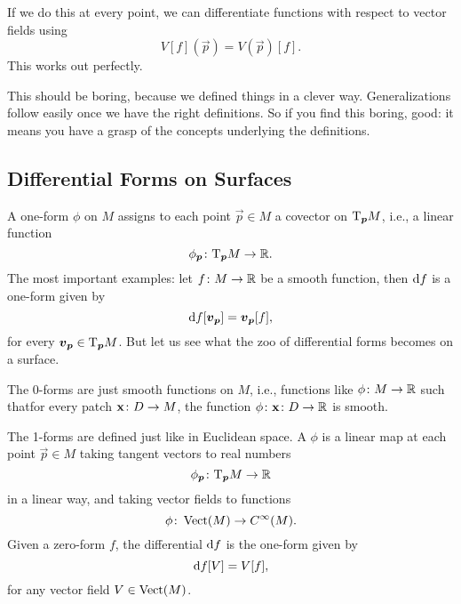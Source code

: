 If we do this at every point, we can differentiate functions with
respect to vector fields using
\begin{equation}
V[f](\vec{p}) = V(\vec{p})[f].
\end{equation}
This works out perfectly.

\begin{remark}[Boring]
This should be boring, because we defined things in a clever way.
Generalizations follow easily once we have the right definitions.
So if you find this boring, good: it means you have a grasp of the
concepts underlying the definitions.
\end{remark}

\subsection{Differential Forms on Surfaces}

\M A one-form $\phi$ on $M$ assigns to each point $\vec{p}\in M$ a
covector on $\mathrm{T}_{\boldsymbol{p}}M$, i.e., a linear function
\begin{equation}
\phi_{\boldsymbol{p}}\colon \mathrm{T}_{\boldsymbol{p}}M\to\mathbb{R}.
\end{equation}
The most important examples: let $f\colon M\to\mathbb{R}$ be a smooth function,
then $\mathrm{d} f$ is a one-form given by
\begin{equation}
\mathrm{d} f[\boldsymbol{v}_{\boldsymbol{p}}] = \boldsymbol{v}_{\boldsymbol{p}}[f],
\end{equation}
for every $\boldsymbol{v}_{\boldsymbol{p}}\in\mathrm{T}_{\boldsymbol{p}}M$.
But let us see what the zoo of differential forms becomes on a surface.

The 0-forms are just smooth functions on $M$, i.e.,
functions like $\phi\colon M\to\mathbb{R}$ such thatfor every patch
$\mathbf{x}\colon D\to M$, the function $\phi\colon\mathbf{x}\colon D\to\mathbb{R}$
is smooth.

The 1-forms are defined just like in Euclidean space. A
 $\phi$ is a linear map at each point $\vec{p}\in M$
taking tangent vectors to real numbers
\begin{equation}
\phi_{\boldsymbol{p}}\colon\mathrm{T}_{\boldsymbol{p}}M\to\mathbb{R}
\end{equation}
in a linear way, and taking vector fields to functions
\begin{equation}
\phi\colon\operatorname{Vect}(M)\to C^{\infty}(M).
\end{equation}
Given a zero-form $f$, the differential $\mathrm{d} f$ is the one-form given by
\begin{equation}
\mathrm{d} f[V] = V[f],
\end{equation}
for any vector field $V\in\operatorname{Vect}(M)$.

